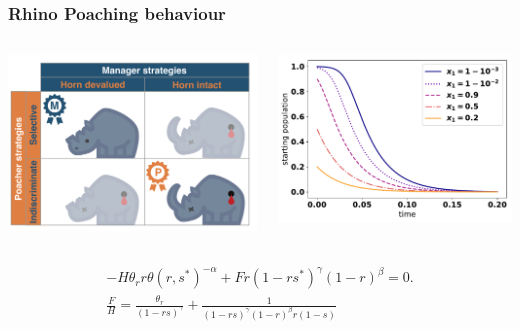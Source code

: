 \documentclass{beamer}
\begin{document}
\begin{frame}[fragile]
    \frametitle{Rhino Poaching behaviour}
    \begin{columns}
        \begin{column}{.5\textwidth}
            \includegraphics[width=.95\textwidth]{./img/RhinoPic.pdf}
        \end{column}
        \begin{column}{.5\textwidth}
            \includegraphics[width=.95\textwidth]{./img/IndiscriminateESS.pdf}
        \end{column}
    \end{columns}

	\begin{eqnarray*}
    \label{eqn:stablemixed}
    - H \theta_r r \theta(r, s^*)^{-\alpha}  + F r (1 - rs^*)^{\gamma}(1 - r)^{\beta} = 0.
    \\
    \frac{F}{H} = \frac{\theta_r}{(1 - rs) ^ {\gamma}} + \frac{1}{(1 - rs) ^ \gamma
    (1- r) ^ {\beta} r (1- s)}
    \end{eqnarray*}


\end{frame}
\end{document}
